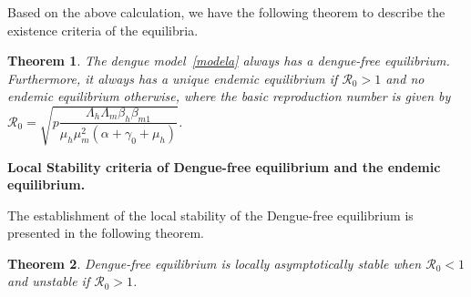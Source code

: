 \documentclass[preprint]{elsarticle}
\newtheorem{theorem}{Theorem}
\begin{document}
Based on the above calculation, we have the following theorem to describe the existence criteria of the equilibria.
\begin{theorem}
    The dengue model~\eqref{modela} always has a dengue-free equilibrium. Furthermore, it always has a unique endemic equilibrium if $\mathcal{R}_0>1$ and no endemic equilibrium otherwise, where the basic reproduction number is given by $\mathcal{R}_0= \sqrt{p \dfrac{\Lambda_h \Lambda_m \beta_h \beta_{m1}}{\mu_h \mu_m^2 (\alpha+\gamma_0+\mu_h)}}$.
\end{theorem}

\textbf{Local Stability criteria of Dengue-free equilibrium and the endemic equilibrium.}

The establishment of the local stability of the Dengue-free equilibrium is presented in the following theorem.
\begin{theorem}
    Dengue-free equilibrium is locally asymptotically stable when $\mathcal{R}_0<1$ and unstable if $\mathcal{R}_0>1$.
\end{theorem}
%
\end{document}
